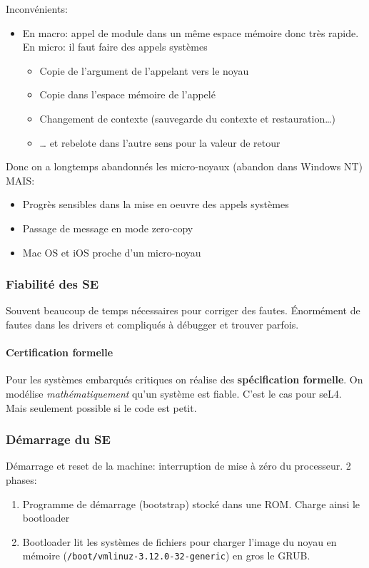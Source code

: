 Inconvénients:

\begin{itemize}
\tightlist
\item
  En macro: appel de module dans un même espace mémoire donc très
  rapide. En micro: il faut faire des appels systèmes

  \begin{itemize}
  \tightlist
  \item
    Copie de l'argument de l'appelant vers le noyau
  \item
    Copie dans l'espace mémoire de l'appelé
  \item
    Changement de contexte (sauvegarde du contexte et
    restauration\ldots)
  \item
    \ldots{} et rebelote dans l'autre sens pour la valeur de retour
  \end{itemize}
\end{itemize}

Donc on a longtemps abandonnés les micro-noyaux (abandon dans Windows
NT) MAIS:

\begin{itemize}
\tightlist
\item
  Progrès sensibles dans la mise en oeuvre des appels systèmes
\item
  Passage de message en mode zero-copy
\item
  Mac OS et iOS proche d'un micro-noyau
\end{itemize}

\subsubsection{Fiabilité des SE}\label{fiabilituxe9-des-se}

Souvent beaucoup de temps nécessaires pour corriger des fautes.
Énormément de fautes dans les drivers et compliqués à débugger et
trouver parfois.

\paragraph{Certification formelle}\label{certification-formelle}

Pour les systèmes embarqués critiques on réalise des
\textbf{spécification formelle}. On modélise \emph{mathématiquement}
qu'un système est fiable. C'est le cas pour seL4. Mais seulement
possible si le code est petit.

\subsubsection{Démarrage du SE}\label{duxe9marrage-du-se}

Démarrage et reset de la machine: interruption de mise à zéro du
processeur. 2 phases:

\begin{enumerate}
\def\labelenumi{\arabic{enumi}.}
\tightlist
\item
  Programme de démarrage (bootstrap) stocké dans une ROM. Charge ainsi
  le bootloader
\item
  Bootloader lit les systèmes de fichiers pour charger l'image du noyau
  en mémoire (\texttt{/boot/vmlinuz-3.12.0-32-generic}) en gros le GRUB.
\end{enumerate}
